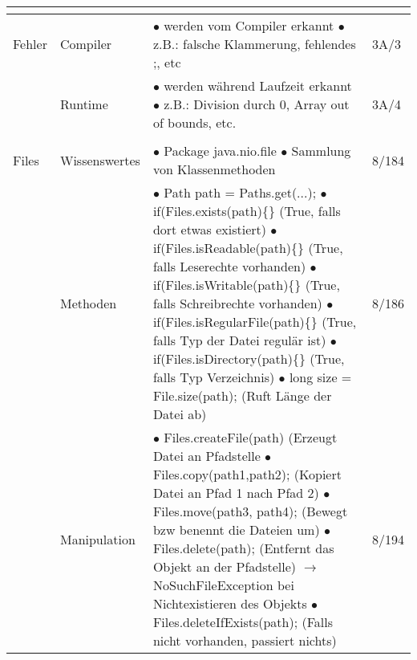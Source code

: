 \documentclass[11pt,a4paper]{article}
\begin{document}
\begin{center}
\begin{longtable}[h]{ | p{2.3cm} | p{2.3cm} | p{12.6cm} | p{1.2cm} | }
	
	
	\multicolumn{3}{c}{} \\ 
	\hline 
	
	
	
	{\large Fehler} & Compiler & \makecell[l]{$\bullet$ werden vom Compiler erkannt \\ 
	$\bullet$ z.B.: falsche Klammerung, fehlendes ;, etc } & 3A/3 \\ \cline{2-4}
	
	& Runtime & \makecell[l]{$\bullet$ werden während Laufzeit erkannt \\ 
	$\bullet$ z.B.: Division durch 0, Array out of bounds, etc.} & 3A/4 \\ \cline{2-4} 
	\hline
	
	
	
	\multicolumn{3}{c}{} \\ 
	\hline 
	
	
	
	{\large Files} & Wissenswertes & \makecell[l]{$\bullet$ Package java.nio.file\\
	$\bullet$ Sammlung von Klassenmethoden } & 8/184 \\ \cline{2-4}
	
	& Methoden & \makecell[l]{$\bullet$ Path path = Paths.get(...);  \\
	$\bullet$ if(Files.exists(path)\{\} (True, falls dort etwas existiert) \\
	$\bullet$ if(Files.isReadable(path)\{\} (True, falls Leserechte vorhanden) \\
	$\bullet$ if(Files.isWritable(path)\{\} (True, falls Schreibrechte vorhanden) \\
	$\bullet$ if(Files.isRegularFile(path)\{\} (True, falls Typ der Datei regulär ist) \\
	$\bullet$ if(Files.isDirectory(path)\{\} (True, falls Typ Verzeichnis) \\
	$\bullet$ long size = File.size(path); (Ruft Länge der Datei ab)}  & 8/186 \\ \cline{2-4}
	
	& Manipulation & \makecell[l]{$\bullet$ Files.createFile(path) (Erzeugt Datei an Pfadstelle \\
	$\bullet$ Files.copy(path1,path2); (Kopiert Datei an Pfad 1 nach Pfad 2) \\
	$\bullet$ Files.move(path3, path4); (Bewegt bzw benennt die Dateien um) \\
	$\bullet$ Files.delete(path); (Entfernt das Objekt an der Pfadstelle) \\
	\hspace{0.4cm} $\rightarrow$ NoSuchFileException bei Nichtexistieren des Objekts \\
	$\bullet$ Files.deleteIfExists(path); (Falls nicht vorhanden, passiert nichts)}  & 8/194 \\ 
	\hline
	

\end{longtable}
\end{center}
\end{document}
